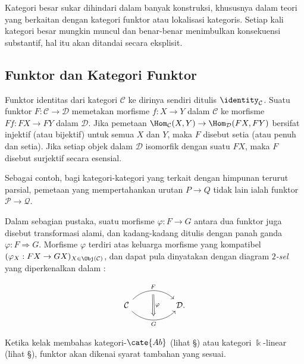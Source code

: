 Kategori besar sukar dihindari dalam banyak konstruksi, khususnya dalam teori yang
berkaitan dengan kategori funktor atau lokalisasi kategoris. Setiap kali kategori besar
mungkin muncul dan benar-benar menimbulkan konsekuensi substantif, hal itu akan
ditandai secara eksplisit.

\subsection*{Funktor dan Kategori Funktor}

Funktor identitas dari kategori $\mathcal{C}$ ke dirinya sendiri ditulis
$\identity_{\mathcal{C}}$. Suatu funktor $F: \mathcal{C} \to \mathcal{D}$
memetakan morfisme $f: X \to Y$ dalam $\mathcal{C}$ ke morfisme
$Ff: FX \to FY$ dalam $\mathcal{D}$. Jika pemetaan
$\Hom_{\mathcal{C}}(X, Y) \to \Hom_{\mathcal{D}}(FX, FY)$ bersifat injektif
(atau bijektif) untuk semua $X$ dan $Y$, maka $F$ disebut setia (atau penuh dan
setia). Jika setiap objek dalam $\mathcal{D}$ isomorfik dengan suatu $FX$, maka
$F$ disebut surjektif secara esensial.

Sebagai contoh, bagi kategori-kategori yang terkait dengan himpunan terurut
parsial, pemetaan yang mempertahankan urutan $P \to Q$ tidak lain ialah funktor
$\mathcal{P} \to \mathcal{Q}$.

Dalam sebagian pustaka, suatu morfisme $\varphi: F \to G$ antara dua funktor
juga disebut transformasi alami, dan kadang-kadang ditulis dengan panah ganda
$\varphi: F \Rightarrow G$. Morfisme $\varphi$ terdiri atas keluarga morfisme
yang kompatibel $(\varphi_X: FX \to GX)_{X \in \Obj(\mathcal{C})}$, dan dapat
pula dinyatakan dengan diagram \emph{$2$-sel} yang diperkenalkan dalam
\cite[\S~2.2]{Li1}:

\[\begin{tikzcd}
	\mathcal{C} \arrow[rr, bend left=45, "F", ""'{name=F}] \arrow[rr, bend right=45, "G"', ""{name=G}] & & \mathcal{D} \arrow[Rightarrow, from=F, to=G, "\varphi"].
\end{tikzcd}\]

Ketika kelak membahas kategori-$\cate{Ab}$ (lihat
\S{}) atau kategori $\Bbbk$-linear (lihat
\S{}), funktor akan dikenai syarat tambahan
yang sesuai.

